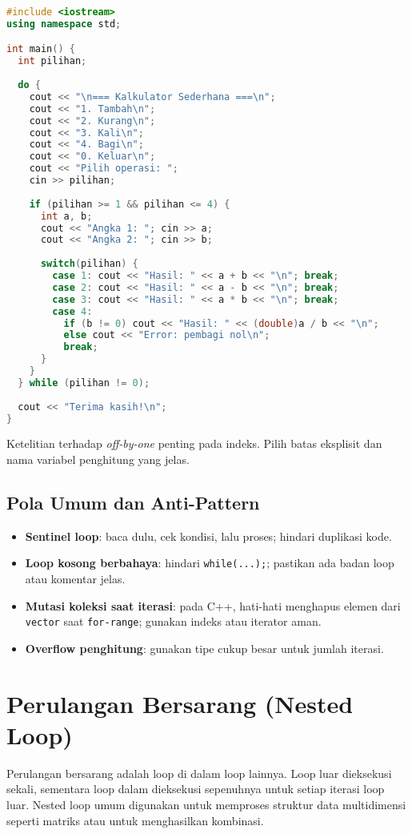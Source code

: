 \documentclass[../main.tex]{subfiles}
\begin{document}
\begin{lstlisting}[language=C++, caption={Validasi input dengan do-while (C++)}]
#include <iostream>
using namespace std;

int main() {
  int pilihan;
  
  do {
    cout << "\n=== Kalkulator Sederhana ===\n";
    cout << "1. Tambah\n";
    cout << "2. Kurang\n";
    cout << "3. Kali\n";
    cout << "4. Bagi\n";
    cout << "0. Keluar\n";
    cout << "Pilih operasi: ";
    cin >> pilihan;
    
    if (pilihan >= 1 && pilihan <= 4) {
      int a, b;
      cout << "Angka 1: "; cin >> a;
      cout << "Angka 2: "; cin >> b;
      
      switch(pilihan) {
        case 1: cout << "Hasil: " << a + b << "\n"; break;
        case 2: cout << "Hasil: " << a - b << "\n"; break;
        case 3: cout << "Hasil: " << a * b << "\n"; break;
        case 4: 
          if (b != 0) cout << "Hasil: " << (double)a / b << "\n";
          else cout << "Error: pembagi nol\n";
          break;
      }
    }
  } while (pilihan != 0);
  
  cout << "Terima kasih!\n";
}
\end{lstlisting}

Ketelitian terhadap \emph{off-by-one} penting pada indeks. Pilih batas eksplisit dan nama variabel penghitung yang jelas.

\subsection{Pola Umum dan Anti-Pattern}
\begin{itemize}
  \item \textbf{Sentinel loop}: baca dulu, cek kondisi, lalu proses; hindari duplikasi kode.
  \item \textbf{Loop kosong berbahaya}: hindari \texttt{while(...);}; pastikan ada badan loop atau komentar jelas.
  \item \textbf{Mutasi koleksi saat iterasi}: pada C++, hati-hati menghapus elemen dari \texttt{vector} saat \texttt{for-range}; gunakan indeks atau iterator aman.
  \item \textbf{Overflow penghitung}: gunakan tipe cukup besar untuk jumlah iterasi.
\end{itemize}

\section{Perulangan Bersarang (Nested Loop)}
Perulangan bersarang adalah loop di dalam loop lainnya. Loop luar dieksekusi sekali, sementara loop dalam dieksekusi sepenuhnya untuk setiap iterasi loop luar. Nested loop umum digunakan untuk memproses struktur data multidimensi seperti matriks atau untuk menghasilkan kombinasi.
\end{document}
